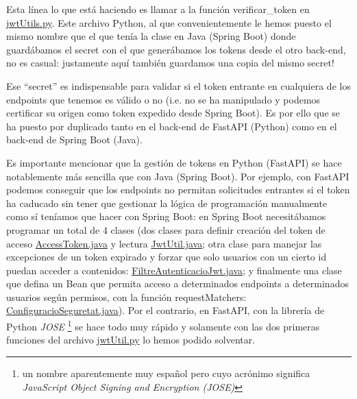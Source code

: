 \documentclass[a4paper,12pt]{report}
\begin{document}
	 Esta línea lo que está haciendo es llamar a la función verificar\_token en \href{https://github.com/blackcub3s/mercApp/blob/main/APP%20WEB/__FastAPI__/app/jwtUtil.py}{jwtUtils.py}. Este archivo Python, al que convenientemente le hemos puesto el mismo nombre que el que tenía la clase en Java (Spring Boot) donde guardábamos el secret con el que generábamos los tokens desde el otro back-end, no es casual: justamente aquí también guardamos una copia del mismo secret!
	
	Ese ``secret'' es indispensable para validar si el token entrante en cualquiera de los endpoints que tenemos es válido o no (i.e. no se ha manipulado y podemos certificar su origen como token expedido desde Spring Boot). Es por ello que se ha puesto por duplicado tanto en el back-end de FastAPI (Python) como en el back-end de Spring Boot (Java).
	
	Es importante mencionar que la gestión de tokens en Python (FastAPI) se hace notablemente más sencilla que con Java (Spring Boot). Por ejemplo, con FastAPI podemos conseguir que los endpoints no permitan solicitudes entrantes si el token ha caducado sin tener que gestionar la lógica de programación manualmente como sí teníamos que hacer con Spring Boot: en Spring Boot necesitábamos programar un total de 4 clases (dos clases para definir creación del token de acceso \href{https://github.com/blackcub3s/mercApp/blob/main/APP%20WEB/__springboot__produccio__/app/src/main/java/miApp/app/seguretat/jwt/AccessToken.java}{AccessToken.java} y lectura \href{https://github.com/blackcub3s/mercApp/blob/main/APP%20WEB/__springboot__produccio__/app/src/main/java/miApp/app/seguretat/jwt/JwtUtil.java}{JwtUtil.java}; otra clase para manejar las excepciones de un token expirado y forzar que solo usuarios con un cierto id puedan acceder a contenidos: \href{https://github.com/blackcub3s/mercApp/blob/main/APP%20WEB/__springboot__produccio__/app/src/main/java/miApp/app/seguretat/FiltreAutenticacioJwt.java}{FiltreAutenticacioJwt.java}; y finalmente una clase que defina un Bean que permita acceso a determinados endpoints a determinados usuarios según permisos, con la función requestMatchers: \href{https://github.com/blackcub3s/mercApp/blob/main/APP%20WEB/__springboot__produccio__/app/src/main/java/miApp/app/seguretat/ConfiguracioSeguretat.java}{ConfiguracioSeguretat.java}). Por el contrario, en FastAPI, con la librería de Python \textit{JOSE} \cite{pythonJose}\footnote{un nombre aparentemente muy español pero cuyo acrónimo significa \textit{JavaScript Object Signing and Encryption (JOSE)}} se hace todo muy rápido y solamente con las dos primeras funciones del archivo \href{https://github.com/blackcub3s/mercApp/blob/main/APP%20WEB/__FastAPI__/app/jwtUtil.py}{jwtUtil.py} lo hemos podido solventar.
	
\end{document}
